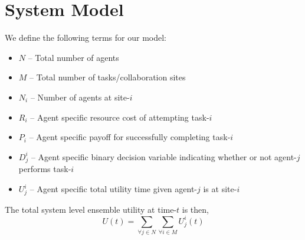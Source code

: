 \documentclass{sage}
\begin{document}
\section{System Model}
We define the following terms for our model:
\begin{itemize}
	\item $N$   -- Total number of agents
	\item $M$   -- Total number of tasks/collaboration sites
	\item $N_i$ -- Number of agents at site-$i$
	\item $R_i$ -- Agent specific resource cost of attempting task-$i$
	\item $P_i$ -- Agent specific payoff for successfully completing task-$i$
	\item $D_j^i$ -- Agent specific binary decision variable indicating whether or not agent-$j$ performs task-$i$
	\item $U_j^i$ -- Agent specific total utility time given agent-$j$ is at site-$i$
\end{itemize}


The total system level ensemble utility at time-$t$ is then,
\begin{equation}
	U(t) = \sum\limits_{\forall j \in N}\sum\limits_{\forall i \in M} U_j^i(t)
\end{equation}
\end{document}
